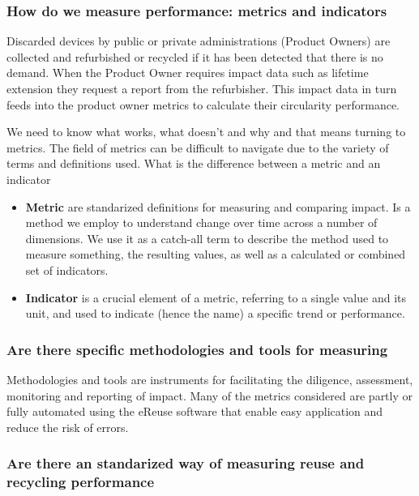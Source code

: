 \documentclass[
]{book}
\begin{document}
\hypertarget{how-do-we-measure-performance-metrics-and-indicators}{%
\subsubsection{How do we measure performance: metrics and indicators}\label{how-do-we-measure-performance-metrics-and-indicators}}

Discarded devices by public or private administrations (Product Owners) are collected and refurbished or recycled if it has been detected that there is no demand. When the Product Owner requires impact data such as lifetime extension they request a report from the refurbisher. This impact data in turn feeds into the product owner metrics to calculate their circularity performance.

We need to know what works, what doesn't and why and that means turning to metrics. The field of metrics can be difficult to navigate due to the variety of terms and definitions used. What is the difference between a metric and an indicator \citep{Verstraeten-Jochemsen2020}

\begin{itemize}
\item
  \textbf{Metric} are standarized definitions for measuring and comparing impact. Is a method we employ to understand change over time across a number of dimensions. We use it as a catch-all term to describe the method used to measure something, the resulting values, as well as a calculated or combined set of indicators.
\item
  \textbf{Indicator} is a crucial element of a metric, referring to a single value and its unit, and used to indicate (hence the name) a specific trend or performance.
\end{itemize}

\hypertarget{are-there-specific-methodologies-and-tools-for-measuring}{%
\subsubsection{Are there specific methodologies and tools for measuring}\label{are-there-specific-methodologies-and-tools-for-measuring}}

Methodologies and tools are instruments for facilitating the diligence, assessment, monitoring and reporting of impact. Many of the metrics considered are partly or fully automated using the eReuse software that enable easy application and reduce the risk of errors.

\hypertarget{are-there-an-standarized-way-of-measuring-reuse-and-recycling-performance}{%
\subsubsection{Are there an standarized way of measuring reuse and recycling performance}\label{are-there-an-standarized-way-of-measuring-reuse-and-recycling-performance}}
\end{document}
